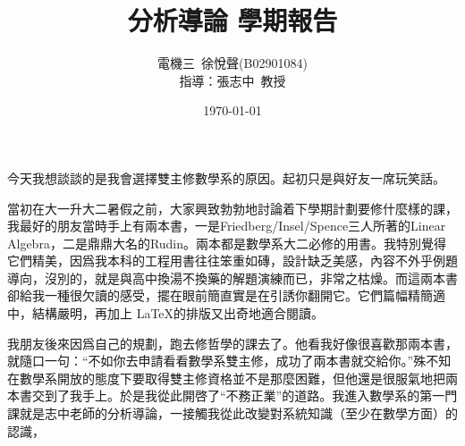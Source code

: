 \documentclass[12pt]{article}
\title{\textbf{分析導論 學期報告}}  %
\author{電機三~徐悅聲(B02901084)\\指導：張志中~教授}      %
\date{\today}      %
\begin{document}
\maketitle                   %

今天我想談談的是我會選擇雙主修數學系的原因。起初只是與好友一席玩笑話。

當初在大一升大二暑假之前，大家興致勃勃地討論着下學期計劃要修什麼樣的課，我最好的朋友當時手上有兩本書，一是Friedberg/Insel/Spence三人所著的Linear Algebra，二是鼎鼎大名的Rudin。兩本都是數學系大二必修的用書。我特別覺得它們精美，因爲我本科的工程用書往往笨重如磚，設計缺乏美感，內容不外乎例題導向，沒別的，就是與高中換湯不換藥的解題演練而已，非常之枯燥。而這兩本書卻給我一種很欠讀的感受，擺在眼前簡直實是在引誘你翻開它。它們篇幅精簡適中，結構嚴明，再加上 \LaTeX 的排版又出奇地適合閱讀。

我朋友後來因爲自己的規劃，跑去修哲學的課去了。他看我好像很喜歡那兩本書，就隨口一句：“不如你去申請看看數學系雙主修，成功了兩本書就交給你。”殊不知在數學系開放的態度下要取得雙主修資格並不是那麼困難，但他還是很服氣地把兩本書交到了我手上。於是我從此開啓了“不務正業”的道路。我進入數學系的第一門課就是志中老師的分析導論，一接觸我從此改變對系統知識（至少在數學方面）的認識，
\end{document}
